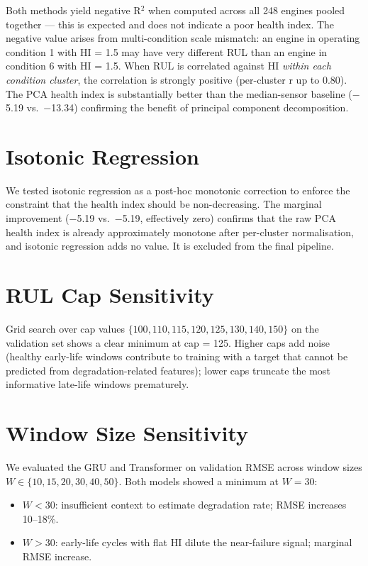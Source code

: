 \documentclass[12pt,a4paper]{report}
\begin{document}
Both methods yield negative R$^2$ when computed across all 248 engines pooled together — this is expected and does not indicate a poor health index. The negative value arises from multi-condition scale mismatch: an engine in operating condition 1 with HI = 1.5 may have very different RUL than an engine in condition 6 with HI = 1.5. When RUL is correlated against HI \textit{within each condition cluster}, the correlation is strongly positive (per-cluster r up to 0.80). The PCA health index is substantially better than the median-sensor baseline ($-$5.19 vs.\ $-$13.34) confirming the benefit of principal component decomposition.

\section{Isotonic Regression}

We tested isotonic regression as a post-hoc monotonic correction to enforce the constraint that the health index should be non-decreasing. The marginal improvement ($-$5.19 vs.\ $-$5.19, effectively zero) confirms that the raw PCA health index is already approximately monotone after per-cluster normalisation, and isotonic regression adds no value. It is excluded from the final pipeline.

\section{RUL Cap Sensitivity}

Grid search over cap values $\{100, 110, 115, 120, 125, 130, 140, 150\}$ on the validation set shows a clear minimum at cap = 125. Higher caps add noise (healthy early-life windows contribute to training with a target that cannot be predicted from degradation-related features); lower caps truncate the most informative late-life windows prematurely.

\section{Window Size Sensitivity}

We evaluated the GRU and Transformer on validation RMSE across window sizes $W \in \{10, 15, 20, 30, 40, 50\}$. Both models showed a minimum at $W = 30$:
\begin{itemize}[leftmargin=1.5cm]
  \item $W < 30$: insufficient context to estimate degradation rate; RMSE increases 10--18\%.
  \item $W > 30$: early-life cycles with flat HI dilute the near-failure signal; marginal RMSE increase.
\end{itemize}
\end{document}

